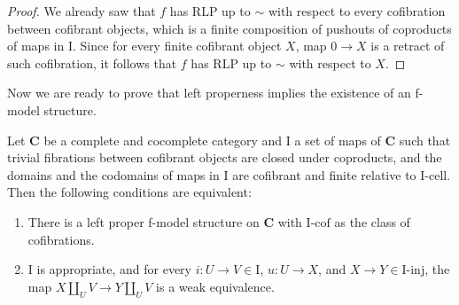\documentclass{amsart}
\theoremstyle{definition}
\newcommand{\cat}[1]{\mathbf{#1}}
\newcommand{\C}{\cat{C}}
\newcommand{\I}{\mathrm{I}}
\newcommand{\class}[2]{#1\text{-}\mathrm{#2}}
\newcommand{\Iinj}[1][\I]{\class{#1}{inj}}
\newcommand{\Icell}[1][\I]{\class{#1}{cell}}
\newcommand{\Icof}[1][\I]{\class{#1}{cof}}
\begin{document}
\begin{proof}
We already saw that $f$ has RLP up to $\sim$ with respect to every cofibration between
cofibrant objects, which is a finite composition of pushouts of coproducts of maps in $\I$.
Since for every finite cofibrant object $X$, map $0 \to X$ is a retract of
such cofibration, it follows that $f$ has RLP up to $\sim$ with respect to $X$.
\end{proof}

Now we are ready to prove that left properness implies the existence of an f-model structure.

\begin{thm}[properness]
Let $\C$ be a complete and cocomplete category and $\I$ a set of maps of $\C$ such that
trivial fibrations between cofibrant objects are closed under coproducts, and the domains
and the codomains of maps in $\I$ are cofibrant and finite relative to $\Icell$.
Then the following conditions are equivalent:
\begin{enumerate}
\item There is a left proper f-model structure on $\C$ with $\Icof$ as the class of cofibrations.
\item $\I$ is appropriate, and for every $i : U \to V \in \I$, $u : U \to X$, and
$X \to Y \in \Iinj$, the map $X \amalg_U V \to Y \amalg_U V$ is a weak equivalence.
\end{enumerate}
\end{thm}
\end{document}
